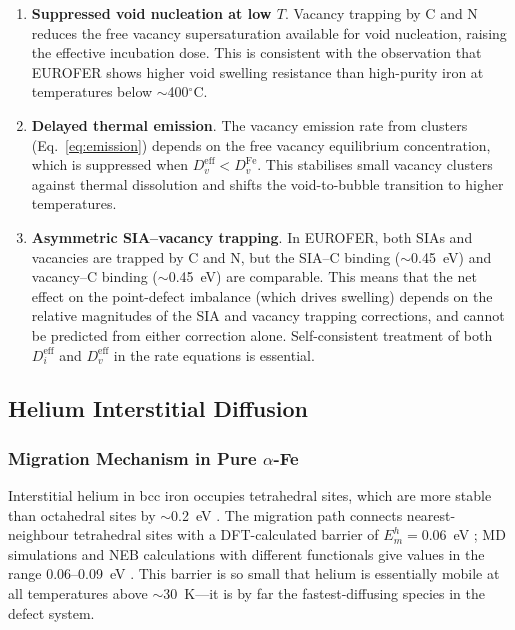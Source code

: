 \documentclass[pdflatex,sn-basic]{sn-jnl} %
\begin{document}
\begin{enumerate}
\item \textbf{Suppressed void nucleation at low $T$}. Vacancy trapping by C
and N reduces the free vacancy supersaturation available for void nucleation,
raising the effective incubation dose. This is consistent with the observation
that EUROFER shows higher void swelling resistance than high-purity iron at
temperatures below $\sim$400$^\circ$C.

\item \textbf{Delayed thermal emission}. The vacancy emission rate from
clusters (Eq.~\ref{eq:emission}) depends on the free vacancy equilibrium
concentration, which is suppressed when $D_v^{\mathrm{eff}} < D_v^{\mathrm{Fe}}$.
This stabilises small vacancy clusters against thermal dissolution and shifts
the void-to-bubble transition to higher temperatures.

\item \textbf{Asymmetric SIA--vacancy trapping}. In EUROFER, both SIAs and
vacancies are trapped by C and N, but the SIA--C binding ($\sim$0.45~eV) and
vacancy--C binding ($\sim$0.45~eV) are comparable. This means that the
net effect on the point-defect imbalance (which drives swelling) depends on
the relative magnitudes of the SIA and vacancy trapping corrections, and
cannot be predicted from either correction alone. Self-consistent treatment
of both $D_i^{\mathrm{eff}}$ and $D_v^{\mathrm{eff}}$ in the rate equations
is essential.
\end{enumerate}


\subsection{Helium Interstitial Diffusion}
\label{sec:helium}

\subsubsection{Migration Mechanism in Pure $\alpha$-Fe}

Interstitial helium in bcc iron occupies tetrahedral sites, which are more
stable than octahedral sites by $\sim$0.2~eV
\citep{Fu2005_He,Seletskaia2005}. The migration path connects
nearest-neighbour tetrahedral sites with a DFT-calculated barrier of
$E_m^h = 0.06$~eV \citep{Fu2005_He}; MD simulations and NEB calculations with
different functionals give values in the range 0.06--0.09~eV
\citep{Morishita2003,Zhang2018_He}. This barrier is so small that helium is
essentially mobile at all temperatures above $\sim$30~K---it is by far the
fastest-diffusing species in the defect system.
\end{document}
